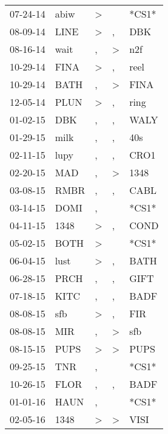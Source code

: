 \begin{supertabular}{lllll}
 07-24-14 &   abiw &     \textgreater &                  &  *CS1* \\
 08-09-14 &   LINE &     \textgreater &                , &    DBK \\
 08-16-14 &   wait &                , &     \textgreater &    n2f \\
 10-29-14 &   FINA &     \textgreater &                , &   reel \\
 10-29-14 &   BATH &                , &     \textgreater &   FINA \\
 12-05-14 &   PLUN &     \textgreater &                , &   ring \\
 01-02-15 &    DBK &                , &                , &   WALY \\
 01-29-15 &   milk &                , &                , &    40s \\
 02-11-15 &   lupy &                , &                , &   CRO1 \\
 02-20-15 &    MAD &                , &     \textgreater &   1348 \\
 03-08-15 &   RMBR &                , &                , &   CABL \\
 03-14-15 &   DOMI &                , &                  &  *CS1* \\
 04-11-15 &   1348 &     \textgreater &                , &   COND \\
 05-02-15 &   BOTH &     \textgreater &                  &  *CS1* \\
 06-04-15 &   lust &     \textgreater &                , &   BATH \\
 06-28-15 &   PRCH &                , &                , &   GIFT \\
 07-18-15 &   KITC &                , &                , &   BADF \\
 08-08-15 &    sfb &     \textgreater &                , &    FIR \\
 08-08-15 &    MIR &                , &     \textgreater &    sfb \\
 08-15-15 &   PUPS &     \textgreater &     \textgreater &   PUPS \\
 09-25-15 &    TNR &                , &                  &  *CS1* \\
 10-26-15 &   FLOR &                , &                , &   BADF \\
 01-01-16 &   HAUN &                , &                  &  *CS1* \\
 02-05-16 &   1348 &     \textgreater &     \textgreater &   VISI \\

\end{supertabular}
